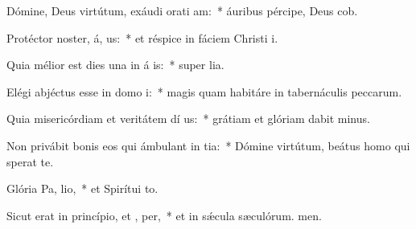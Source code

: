 \item Dómine, Deus virtútum, exáudi orati am:~* áuribus pércipe, Deus cob.
\item Protéctor noster, á, us:~* et réspice in fáciem Christi i.
\item Quia mélior est dies una in á is:~* super lia.
\item Elégi abjéctus esse in domo  i:~* magis quam habitáre in tabernáculis peccarum.
\item Quia misericórdiam et veritátem dí us:~* grátiam et glóriam dabit minus.
\item Non privábit bonis eos qui ámbulant in tia:~* Dómine virtútum, beátus homo qui sperat  te.
\item Glória Pa,  lio,~* et Spirítui to.
\item Sicut erat in princípio, et ,  per,~* et in sǽcula sæculórum. men.
